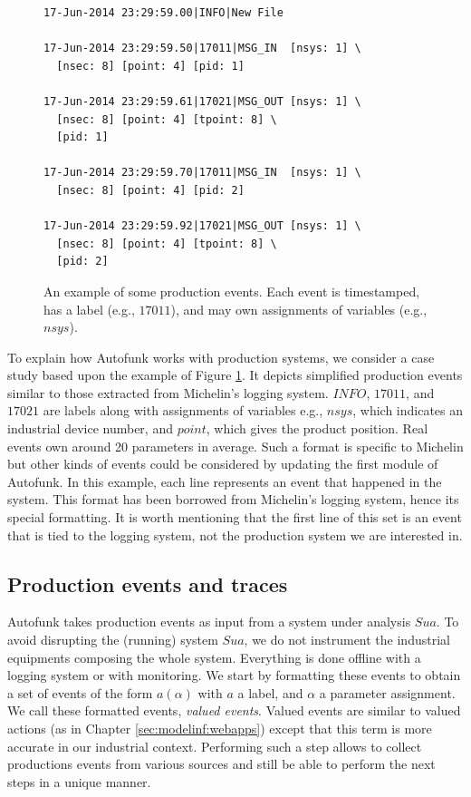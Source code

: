 \begin{figure}[ht]
\begin{framed}
\begin{BVerbatim}
17-Jun-2014 23:29:59.00|INFO|New File

17-Jun-2014 23:29:59.50|17011|MSG_IN  [nsys: 1] \
  [nsec: 8] [point: 4] [pid: 1]

17-Jun-2014 23:29:59.61|17021|MSG_OUT [nsys: 1] \
  [nsec: 8] [point: 4] [tpoint: 8] \
  [pid: 1]

17-Jun-2014 23:29:59.70|17011|MSG_IN  [nsys: 1] \
  [nsec: 8] [point: 4] [pid: 2]

17-Jun-2014 23:29:59.92|17021|MSG_OUT [nsys: 1] \
  [nsec: 8] [point: 4] [tpoint: 8] \
  [pid: 2]
\end{BVerbatim}
\end{framed}

\caption{An example of some production events. Each event is
timestamped, has a label (e.g., $17011$), and may own
assignments of variables (e.g., $nsys$).}
\label{fig:rawdatum}
\end{figure}

To explain how Autofunk works with production systems, we
consider a case study based upon the example of Figure
\ref{fig:rawdatum}. It depicts simplified production events
similar to those extracted from Michelin's logging system.
$INFO$, $17011$, and $17021$ are labels along
with assignments of variables e.g., $nsys$, which indicates an
industrial device number, and $point$, which gives the product
position.  Real events own around 20 parameters in average. Such
a format is specific to Michelin but other kinds of events could
be considered by updating the first module of Autofunk.  In this
example, each line represents an event that happened in the
system. This format has been borrowed from Michelin's logging
system, hence its special formatting. It is worth mentioning that
the first line of this set is an event that is tied to the
logging system, not the production system we are interested in.

\subsection{Production events and traces}
\label{part3:collecting}

Autofunk takes production events as input from a system under
analysis $\mathit{Sua}$. To avoid disrupting the (running) system $\mathit{Sua}$,
we do not instrument the industrial equipments composing the
whole system. Everything is done offline with a logging system or
with monitoring. We start by formatting these events to obtain a
set of events of the form $a(\alpha)$ with $a$ a label, and
$\alpha$ a parameter assignment. We call these formatted events,
\textit{valued events}. Valued events are similar to valued
actions (as in Chapter \ref{sec:modelinf:webapps}) except that
this term is more accurate in our industrial context.  Performing
such a step allows to collect productions events from various
sources and still be able to perform the next steps in a unique
manner.

